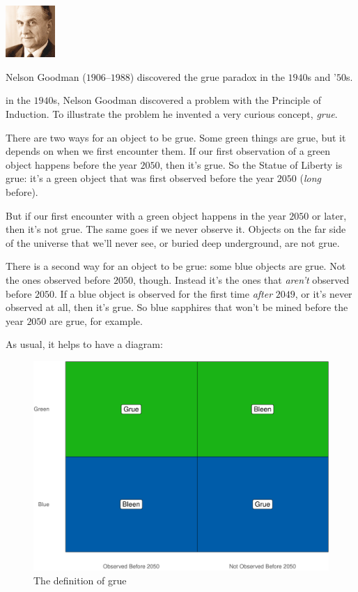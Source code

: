 \documentclass[justified]{tufte-book}
\theoremstyle{definition}
\theoremstyle{definition}
\theoremstyle{definition}
\theoremstyle{remark}
\begin{document}
\begin{marginfigure}
\includegraphics[width=0.74in]{img/goodman} \caption[Nelson Goodman ($1906$--$1988$) discovered the grue paradox in the $1940$s and '$50$s]{Nelson Goodman ($1906$--$1988$) discovered the grue paradox in the $1940$s and '$50$s.}\label{fig:unnamed-chunk-167}
\end{marginfigure}

 in the \(1940\)s, Nelson Goodman discovered a problem
with the Principle of Induction. To illustrate the problem he invented a
very curious concept, \emph{grue}.

There are two ways for an object to be grue. Some green things are grue,
but it depends on when we first encounter them. If our first observation
of a green object happens before the year \(2050\), then it's grue. So
the Statue of Liberty is grue: it's a green object that was first
observed before the year \(2050\) (\emph{long} before).

But if our first encounter with a green object happens in the year
\(2050\) or later, then it's not grue. The same goes if we never observe
it. Objects on the far side of the universe that we'll never see, or
buried deep underground, are not grue.

There is a second way for an object to be grue: some blue objects are
grue. Not the ones observed before \(2050\), though. Instead it's the
ones that \emph{aren't} observed before \(2050\). If a blue object is
observed for the first time \emph{after} \(2049\), or it's never
observed at all, then it's grue. So blue sapphires that won't be mined
before the year \(2050\) are grue, for example.

As usual, it helps to have a diagram:

\begin{figure}
\includegraphics{_main_files/figure-latex/unnamed-chunk-168-1} \caption[The definition of grue]{The definition of grue}\label{fig:unnamed-chunk-168}
\end{figure}
\end{document}
